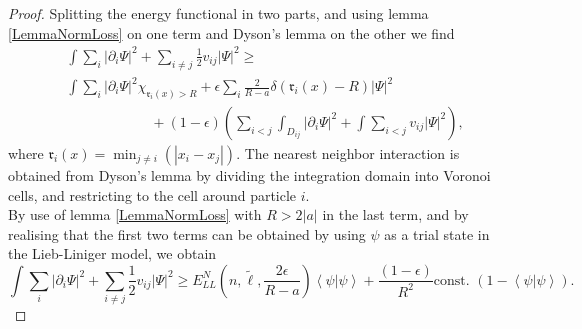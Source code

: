 \documentclass[a4paper,11pt]{article}
\newcommand{\abs}[1]{\left\lvert #1 \right\rvert}
\renewcommand{\braket}[1]{\left\langle#1\right\rangle}
\numberwithin{equation}{section}
\begin{document}
	\begin{proof}
		Splitting the energy functional in two parts, and using lemma \ref{LemmaNormLoss} on one term and Dyson's lemma on the other we find 
		\begin{equation}
		\begin{aligned}
		&\int \sum_{i}\abs{\partial_i\Psi}^2+\sum_{i\neq j} \frac{1}{2}v_{ij}\abs{\Psi}^2\geq\\ &\int\sum_{i}\abs{\partial_i\Psi}^2\chi_{\mathfrak{r}_i(x)>R}+\epsilon\sum_{i}\frac{2}{R-a}\delta(\mathfrak{r}_i(x)-R)\abs{\Psi}^2\\&\qquad\qquad\qquad+ (1-\epsilon)\left(\sum_{i<j}\int_{D_{ij}}\abs{\partial_i \Psi}^2+\int\sum_{i<j} v_{ij} \abs{\Psi}^2\right),
		\end{aligned}
		\end{equation}
		where $ \mathfrak{r}_i(x)=\min_{j\neq i}(\abs{x_i-x_j}) $. The nearest neighbor interaction is obtained from Dyson's lemma by dividing the integration domain into Voronoi cells, and restricting to the cell around particle $ i $.\\
		By use of lemma \ref{LemmaNormLoss} with $ R>2\abs{a} $ in the last term, and by realising that the first two terms can be obtained by using $ \psi $ as a trial state in the Lieb-Liniger model, we obtain\begin{equation}
		\int \sum_{i}\abs{\partial_i\Psi}^2+\sum_{i\neq j} \frac{1}{2}v_{ij}\abs{\Psi}^2\geq E_{LL}^N \left(n,\tilde{\ell},\frac{2\epsilon}{R-a}\right)\braket{\psi|\psi}+ \frac{(1-\epsilon)}{R^2}\text{const. }(1-\braket{\psi|\psi}).
		\end{equation}
	\end{proof}
	
\end{document}
